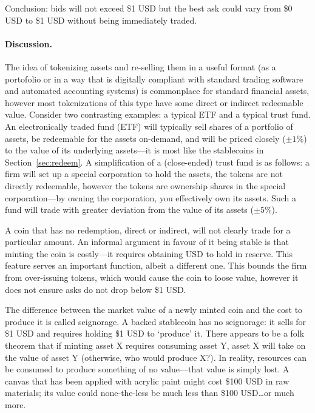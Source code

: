 Conclusion: bids will not exceed \$1 USD but the best ask could vary from \$0 USD to \$1 USD without being immediately traded.

\paragraph{Discussion.} The idea of tokenizing assets and re-selling them in a useful format (\eg as a portofolio or in a way that is digitally compliant with standard trading software and automated accounting systems) is commonplace for standard financial assets, however most tokenizations of this type have some direct or indirect redeemable value. Consider two contrasting examples: a typical ETF and a typical trust fund. An electronically traded fund (ETF) will typically sell shares of a portfolio of assets, be redeemable for the assets on-demand, and will be priced closely ($\pm 1\%$) to the value of its underlying assets---it is most like the stablecoins in Section~\ref{sec:redeem}. A simplification of a (close-ended) trust fund is as follows: a firm will set up a special corporation to hold the assets, the tokens are not directly redeemable, however the tokens are ownership shares in the special corporation---by owning the corporation, you effectively own its assets. Such a fund will trade with greater deviation from the value of its assets ($\pm 5\%$).


A coin that has no redemption, direct or indirect, will not clearly trade for a particular amount. An informal argument in favour of it being stable is that minting the coin is costly---it requires obtaining USD to hold in reserve. This feature serves an important function, albeit a different one. This bounds the firm from over-issuing tokens, which would cause the coin to loose value, however it does not ensure asks do not drop below \$1 USD.

The difference between the market value of a newly minted coin and the cost to produce it is called seignorage. A backed stablecoin has no seignorage: it sells for \$1 USD and requires holding \$1 USD to `produce' it. There appears to be a folk theorem that if minting asset X requires consuming asset Y, asset X will take on the value of asset Y (otherwise, who would produce X?). In reality, resources can be consumed to produce something of no value---that value is simply lost. A canvas that has been applied with acrylic paint might cost \$100 USD in raw materials; its value could none-the-less be much less than \$100 USD\ldots or much more.

